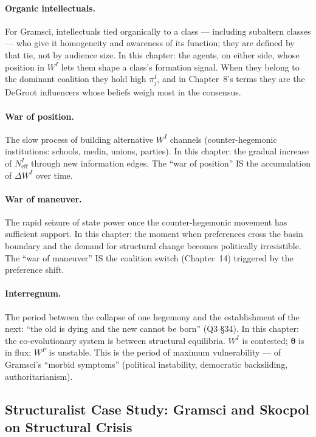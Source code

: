 \documentclass[../structural_economics_book.tex]{subfiles}
\begin{document}
\paragraph{Organic intellectuals.} For Gramsci, intellectuals tied organically to a class --- including subaltern classes --- who give it homogeneity and awareness of its function; they are defined by that tie, not by audience size. In this chapter: the agents, on either side, whose position in $W^I$ lets them shape a class's formation signal. When they belong to the dominant coalition they hold high $\pi^I_j$, and in Chapter~8's terms they are the DeGroot influencers whose beliefs weigh most in the consensus.

\paragraph{War of position.} The slow process of building alternative $W^I$ channels (counter-hegemonic institutions: schools, media, unions, parties). In this chapter: the gradual increase of $N_{\text{eff}}^I$ through new information edges. The ``war of position'' IS the accumulation of $\Delta W^I$ over time.

\paragraph{War of maneuver.} The rapid seizure of state power once the counter-hegemonic movement has sufficient support. In this chapter: the moment when preferences cross the basin boundary and the demand for structural change becomes politically irresistible. The ``war of maneuver'' IS the coalition switch (Chapter~14) triggered by the preference shift.

\paragraph{Interregnum.} The period between the collapse of one hegemony and the establishment of the next: ``the old is dying and the new cannot be born'' (Q3 \S34). In this chapter: the co-evolutionary system is between structural equilibria. $W^I$ is contested; $\boldsymbol{\theta}$ is in flux; $W^P$ is unstable. This is the period of maximum vulnerability --- of Gramsci's ``morbid symptoms'' (political instability, democratic backsliding, authoritarianism).


\subsection*{Structuralist Case Study: Gramsci and Skocpol on Structural Crisis}
\end{document}
